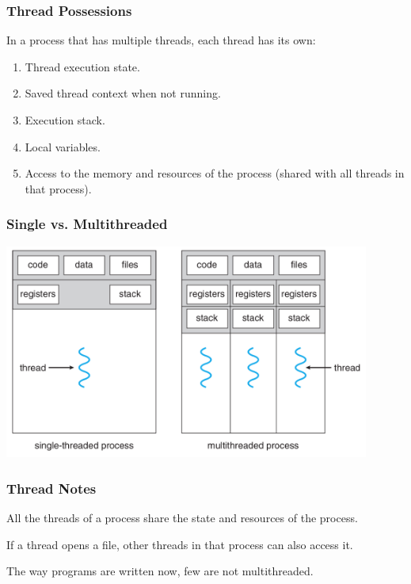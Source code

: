 \begin{frame}
	\frametitle{Thread Possessions}


	In a process that has multiple threads, each thread has its own:
	\begin{enumerate}
		\item Thread execution state.
		\item Saved thread context when not running.
		\item Execution stack.
		\item Local variables.
		\item Access to the memory and resources of the process (shared with all threads in that process).
	\end{enumerate}

\end{frame}

\begin{frame}
	\frametitle{Single vs. Multithreaded}

	\begin{center}
		\includegraphics[width=0.9\textwidth]{images/mthread2.png}
	\end{center}

\end{frame}

\begin{frame}
	\frametitle{Thread Notes}

	All the threads of a process share the state and resources of the process.

	If a thread opens a file, other threads in that process can also access it.

	The way programs are written now, few are not multithreaded.



\end{frame}

